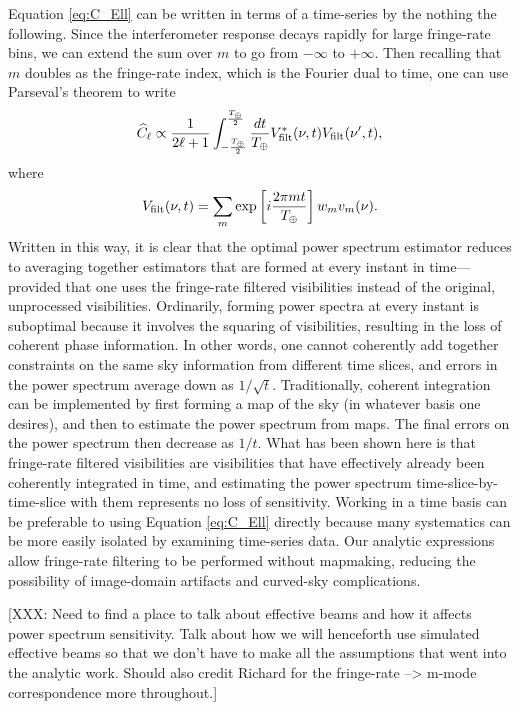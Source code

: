 \documentclass[twocolumn,apj,numberedappendix]{emulateapj}
\begin{document}
Equation \eqref{eq:C_Ell} can be written in terms of a time-series by the nothing the following.  Since the interferometer response decays rapidly for large fringe-rate bins, we can extend the sum over $m$ to go from $-\infty$ to $+\infty$.  Then recalling that $m$ doubles as the fringe-rate index, which is the Fourier dual to time, one can use Parseval's theorem to write
\begin{equation}
\widehat{C}_\ell \propto \frac{1}{2\ell +1}  \int_{-\frac{T_\Earth}{2}}^{\frac{T_\Earth}{2}} \frac{dt}{T_\Earth}   V_{\textrm{filt}}^* (\nu,t) V_\textrm{filt} (\nu^\prime,t),
\end{equation}
where
\begin{equation}
V_\textrm{filt}(\nu,t)=  \sum_m \exp \left[i \frac{2 \pi m t}{T_\Earth}\right] w_m v_m (\nu).
\end{equation}
Written in this way, it is clear that the optimal power spectrum estimator reduces to averaging together estimators that are formed at every instant in time---provided that one uses the fringe-rate filtered visibilities instead of the original, unprocessed visibilities.  Ordinarily, forming power spectra at every instant is suboptimal because it involves the squaring of visibilities, resulting in the loss of coherent phase information.  In other words, one cannot coherently add together constraints on the same sky information from different time slices, and errors in the power spectrum average down as $1/\sqrt{t}$.  Traditionally, coherent integration can be implemented by first forming a map of the sky (in whatever basis one desires), and then to estimate the power spectrum from maps.  The final errors on the power spectrum then decrease as $1/t$.  What has been shown here is that fringe-rate filtered visibilities are visibilities that have effectively already been coherently integrated in time, and estimating the power spectrum time-slice-by-time-slice with them represents no loss of sensitivity.  Working in a time basis can be preferable to using Equation \eqref{eq:C_Ell} directly because many systematics can be more easily isolated by examining time-series data.  Our analytic expressions allow fringe-rate filtering to be performed without mapmaking, reducing the possibility of image-domain artifacts and curved-sky complications.

[XXX: Need to find a place to talk about effective beams and how it affects power spectrum sensitivity.  Talk about how we will henceforth use simulated effective beams so that we don't have to make all the assumptions that went into the analytic work.  Should also credit Richard for the fringe-rate --> m-mode correspondence more throughout.]
\end{document}
